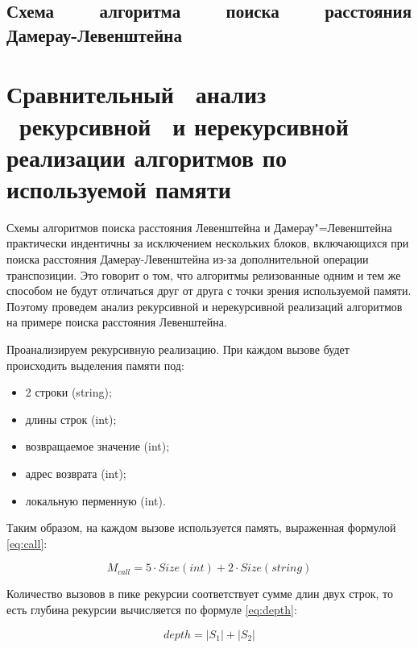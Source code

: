 \clearpage

\subsection[Схема алгоритма поиска расстояния Дамерау-Левенштейна]
           {Схема ~~~~алгоритма ~~~~поиска ~~~~расстояния Дамерау-Левенштейна}
\section[\nohyphens{Сравнительный ~анализ ~рекурсивной ~и нерекурсивной реализации
         алгоритмов по используемой памяти}]
         {Сравнительный ~анализ ~рекурсивной ~и нерекурсивной реализации
         алгоритмов по используемой памяти}

Схемы алгоритмов поиска расстояния Левенштейна и Дамерау"=Левенштейна
практически индентичны за исключением нескольких блоков, включающихся при
поиска расстояния Дамерау-Левенштейна из-за дополнительной операции
транспозиции. Это говорит о том, что алгоритмы релизованные одним и тем же
способом не будут отличаться друг от друга с точки зрения используемой памяти.
Поэтому проведем анализ рекурсивной и нерекурсивной реализаций алгоритмов на
примере поиска расстояния Левенштейна.

Проанализируем рекурсивную реализацию. При каждом вызове будет происходить
выделения памяти под:
\begin{itemize}
    \item 2 строки (string);
    \item длины строк (int);
    \item возвращаемое значение (int);
    \item адрес возврата (int);
    \item локальную перменную (int).
\end{itemize}

Таким образом, на каждом вызове используется память, выраженная формулой
\ref{eq:call}:

\begin{equation}\label{eq:call}
    M_{call} = 5 \cdot Size(int) + 2 \cdot Size(string)
\end{equation}

Количество вызовов в пике рекурсии соответствует сумме длин двух строк, то есть
глубина рекурсии вычисляется по формуле \ref{eq:depth}:

\begin{equation}\label{eq:depth}
    depth = |S_1| + |S_2|
\end{equation}

